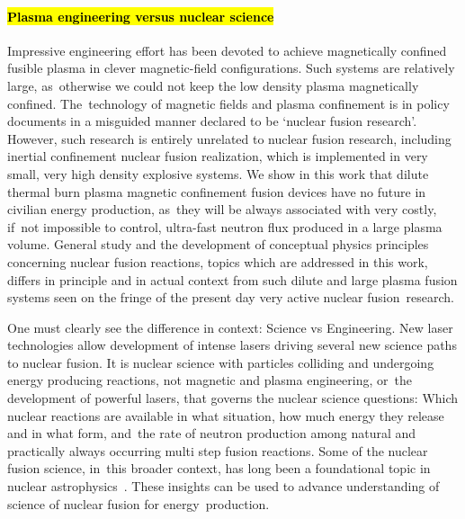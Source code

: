 \documentclass[particles,article,accept,pdftex,moreauthors]{Definitions/mdpi}
\begin{document}
\vspace{-6pt}\paragraph*{\bf \hl{Plasma engineering versus nuclear science} %
}
Impressive engineering effort has been devoted to achieve magnetically confined fusible plasma in clever magnetic-field configurations. Such systems are relatively large, as~otherwise we could not keep the low density plasma magnetically confined. The~technology of magnetic fields and plasma confinement is in policy documents in a misguided manner declared to be `nuclear fusion research'. However, such research is entirely unrelated to nuclear fusion research, including inertial confinement nuclear fusion realization, which is implemented in very small, very high density explosive systems. We show in this work that dilute thermal burn plasma magnetic confinement fusion devices have no future in civilian energy production, as~they will be always associated with very costly, if~not impossible to control, ultra-fast neutron flux produced in a large plasma volume. General study and the development of conceptual physics principles concerning nuclear fusion reactions, topics which are addressed in this work, differs in principle and in actual context from such dilute and large plasma fusion systems seen on the fringe of the present day very active nuclear fusion~research. 

One must clearly see the difference in context: Science vs Engineering. New laser technologies allow development of intense lasers driving several new science paths to nuclear fusion. It is nuclear science with particles colliding and undergoing energy producing reactions, not magnetic and plasma engineering, or~the development of powerful lasers, that governs the nuclear science questions: Which nuclear reactions are available in what situation, how much energy they release and in what form, and~the rate of neutron production among natural and practically always occurring multi step fusion reactions. Some of the nuclear fusion science, in~this broader context, has long been a foundational topic in nuclear astrophysics~\cite{Salas2026Neelima,Nunes:2009,Iliadis:2007,Arnett:1996ev,Rolfs:1988,Clayton:1984}. These insights can be used to advance understanding of science of nuclear fusion for energy~production.
\end{document}
